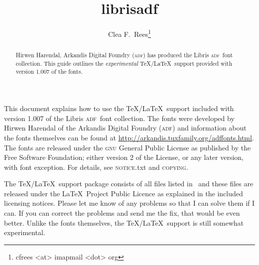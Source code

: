 \documentclass[11pt,british]{article}
\title{librisadf}
\author{Clea F.\ Rees\footnote{cfrees <at> imapmail <dot> org}}
\date{\dyddiad}
\begin{document}
\maketitle\thispagestyle{empty}
\setlength{\parindent}{0pt}
\setlength{\parskip}{0.5em}
	
	
\newcommand*{\adf}{\textsc{adf}}
\newcommand*{\lpack}[1]{\textorigsf{#1}}
\newcommand*{\fgroup}[1]{\textorigsf{#1}}
\newcommand*{\fname}[1]{\textorigsf{#1}}

\begin{abstract}
	\hspace*{-\parindent}Hirwen Harendal, Arkandis Digital Foundry (\adf) has produced the Libris \adf\ font collection. This guide outlines the \emph{experimental} \TeX/\LaTeX\ support provided with version 1.007 of the fonts.
\end{abstract}

This document explains how to use the \TeX/\LaTeX\ support included with version 1.007 of the Libris \adf\ font collection. The fonts were developed by Hirwen Harendal of the Arkandis Digital Foundry (\adf) and information about the fonts themselves can be found at \url{http://arkandis.tuxfamily.org/adffonts.html}. The fonts are released under the \textsc{gnu} General Public License as published by the Free Software Foundation; either version 2 of the License, or any later version, with font exception. For details, see \textsc{notice}.txt and \textsc{copying}.

The \TeX/\LaTeX\ support package consists of all files listed in \ and these files are released under the \LaTeX\ Project Public Licence as explained in the included licensing notices. Please let me know of any problems so that I can solve them if I can. If you can correct the problems and send me the fix, that would be even better. Unlike the fonts themselves, the \TeX/\LaTeX\ support is still somewhat experimental.
\end{document}
